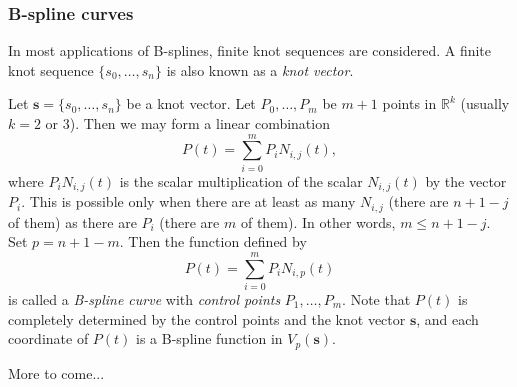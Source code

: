 \documentclass[12pt]{article}
\begin{document}
\subsubsection*{B-spline curves}

In most applications of B-splines, finite knot sequences are considered.  A finite knot sequence $\lbrace s_0,\ldots, s_n\rbrace$ is also known as a \emph{knot vector}.

Let $\boldsymbol{s}=\lbrace s_0,\ldots, s_n\rbrace$ be a knot vector.  Let $P_0,\ldots, P_m$ be $m+1$ points in $\mathbb{R}^k$ (usually $k=2$ or $3$).  Then we may form a linear combination 
$$P(t)=\sum_{i=0}^m P_i N_{i,j}(t),$$ where $P_i N_{i,j}(t)$ is the scalar multiplication of the scalar $N_{i,j}(t)$ by the vector $P_i$.  This is possible only when there are at least as many $N_{i,j}$ (there are $n+1-j$ of them) as there are $P_i$ (there are $m$ of them).  In other words, $m\le n+1-j$.  Set $p=n+1-m$.  Then the function defined by 
$$P(t)=\sum_{i=0}^m P_i N_{i,p}(t)$$ is called a \emph{B-spline curve} with \emph{control points} $P_1,\ldots, P_m$.  Note that $P(t)$ is completely determined by the control points and the knot vector $\boldsymbol{s}$, and each coordinate of $P(t)$ is a B-spline function in $V_p(\boldsymbol{s})$.

More to come...

\end{document}
